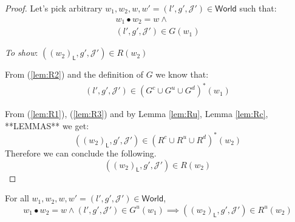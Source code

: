 {\parindent0pt
\begin{proof}
Let's pick arbitrary $w_1, w_2, w, w' = (l', g', \mathcal{J}') \in \mathsf{World}$ such that:
\begin{gather}
	\label{lem:R1} w_1 \bullet w_2 = w \land
	\\
	\label{lem:R2} (l', g', \mathcal{J}') \in G(w_1)
\end{gather}

\textit{To show}: $((w_2)_\mathsf{L}, g', \mathcal{J}') \in R(w_2)$

From (\ref{lem:R2}) and the definition of $G$ we know that:
\begin{gather}
	\label{lem:R3} (l', g', \mathcal{J}') \in (G^c \cup G^u \cup G^d)^*(w_1)
\end{gather}

From (\ref{lem:R1}), (\ref{lem:R3}) and by Lemma \ref{lem:Ru}, Lemma \ref{lem:Rc}, **LEMMAS** we get:
\[
	((w_2)_\mathsf{L}, g', \mathcal{J}') \in (R^c \cup R^u \cup R^d)^*(w_2)
\]
Therefore we can conclude the following.
\[
	((w_2)_\mathsf{L}, g', \mathcal{J}') \in R(w_2)
\]
\end{proof}
}

\lem \label{lem:Ru} For all $w_1, w_2, w, w' = (l', g', \mathcal{J}') \in \mathsf{World}$,
\[
	w_1 \bullet w_2 = w \land (l', g', \mathcal{J}') \in G^u(w_1) \implies ((w_2)_\mathsf{L}, g', \mathcal{J}') \in R^u(w_2)
\]

